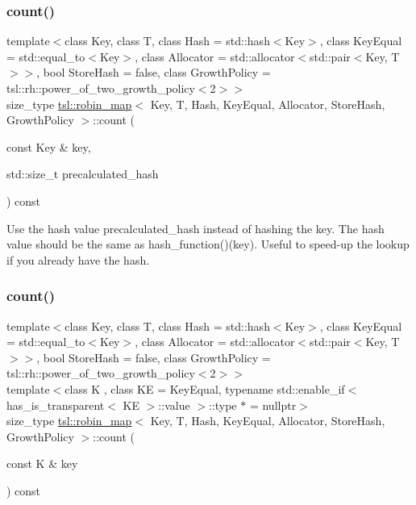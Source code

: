 \subsubsection{\texorpdfstring{count()}{count()}\hspace{0.1cm}{\footnotesize\ttfamily [1/3]}}
{\footnotesize\ttfamily template$<$class Key, class T, class Hash = std\+::hash$<$\+Key$>$, class Key\+Equal = std\+::equal\+\_\+to$<$\+Key$>$, class Allocator = std\+::allocator$<$std\+::pair$<$\+Key, T$>$$>$, bool Store\+Hash = false, class Growth\+Policy = tsl\+::rh\+::power\+\_\+of\+\_\+two\+\_\+growth\+\_\+policy$<$2$>$$>$ \\
size\+\_\+type \mbox{\hyperlink{classtsl_1_1robin__map}{tsl\+::robin\+\_\+map}}$<$ Key, T, Hash, Key\+Equal, Allocator, Store\+Hash, Growth\+Policy $>$\+::count (\begin{DoxyParamCaption}\item[{const Key \&}]{key,  }\item[{std\+::size\+\_\+t}]{precalculated\+\_\+hash }\end{DoxyParamCaption}) const\hspace{0.3cm}{\ttfamily [inline]}}

Use the hash value \textquotesingle{}precalculated\+\_\+hash\textquotesingle{} instead of hashing the key. The hash value should be the same as hash\+\_\+function()(key). Useful to speed-\/up the lookup if you already have the hash. \mbox{\label{classtsl_1_1robin__map_a2cbedaf29421535022d2bce6f703b67e}} 
\subsubsection{\texorpdfstring{count()}{count()}\hspace{0.1cm}{\footnotesize\ttfamily [2/3]}}
{\footnotesize\ttfamily template$<$class Key, class T, class Hash = std\+::hash$<$\+Key$>$, class Key\+Equal = std\+::equal\+\_\+to$<$\+Key$>$, class Allocator = std\+::allocator$<$std\+::pair$<$\+Key, T$>$$>$, bool Store\+Hash = false, class Growth\+Policy = tsl\+::rh\+::power\+\_\+of\+\_\+two\+\_\+growth\+\_\+policy$<$2$>$$>$ \\
template$<$class K , class KE  = Key\+Equal, typename std\+::enable\+\_\+if$<$ has\+\_\+is\+\_\+transparent$<$ K\+E $>$\+::value $>$\+::type $\ast$  = nullptr$>$ \\
size\+\_\+type \mbox{\hyperlink{classtsl_1_1robin__map}{tsl\+::robin\+\_\+map}}$<$ Key, T, Hash, Key\+Equal, Allocator, Store\+Hash, Growth\+Policy $>$\+::count (\begin{DoxyParamCaption}\item[{const K \&}]{key }\end{DoxyParamCaption}) const\hspace{0.3cm}{\ttfamily [inline]}}

